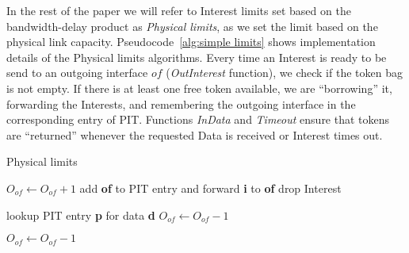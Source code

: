In the rest of the paper we will refer to Interest limits set based on the bandwidth-delay product as \emph{Physical limits}, as we set the limit based on the physical link capacity.
Pseudocode~\ref{alg:simple limits} shows implementation details of the Physical limits algorithms.
Every time an Interest is ready to be send to an outgoing interface $of$ (\emph{OutInterest} function), we check if the token bag is not empty.
If there is at least one free token available, we are ``borrowing'' it, forwarding the Interests, and remembering the outgoing interface in the corresponding entry of PIT.
Functions \emph{InData} and \emph{Timeout} ensure that tokens are ``returned'' whenever the requested Data is received or Interest times out.


\begin{algorithm}[h]
\caption{Physical limits}
\label{alg:simple limits}
\begin{algorithmic}[1]
     
\EndFor

\vspace{0.2cm}
     
        \State $O_{of} \leftarrow O_{of} + 1$  
        \State add \textbf{of} to PIT entry and forward \textbf{i} to \textbf{of}
    \Else
        \State drop Interest
    \EndIf
\EndFunction

\vspace{0.2cm}

   \State lookup PIT entry \textbf{p} for data \textbf{d}
        \State $O_{of} \leftarrow O_{of} - 1$ 
   \EndFor
\EndFunction

\vspace{0.2cm}

        \State $O_{of} \leftarrow O_{of} - 1$ 
   \EndFor
\EndFunction

\end{algorithmic}
\end{algorithm}



